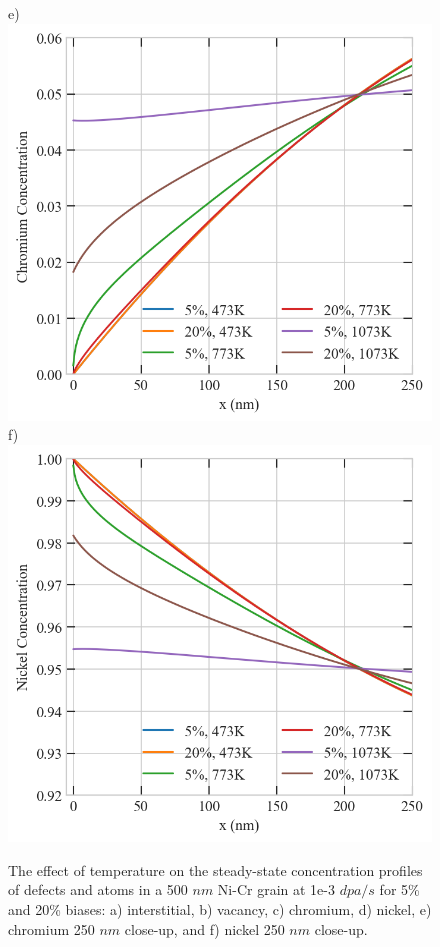 \documentclass[utf8]{frontiersSCNS} %
\begin{document}
\begin{figure}[h!]
        e)\includegraphics[scale=0.55]{srrt/plots/Fig15_e.png}
        f)\includegraphics[scale=0.55]{srrt/plots/Fig15_f.png}
        \caption{The effect of temperature on the steady-state concentration profiles of defects and atoms in a 500 $nm$ Ni-Cr grain at 1e-3 $dpa/s$ for 5\% and 20\% biases: a) interstitial, b) vacancy, c) chromium, d) nickel, e) chromium 250 $nm$ close-up, and f) nickel 250 $nm$ close-up.}
        \label{figure:RIS_473vs773vs1073}
    \end{figure}
\end{document}
